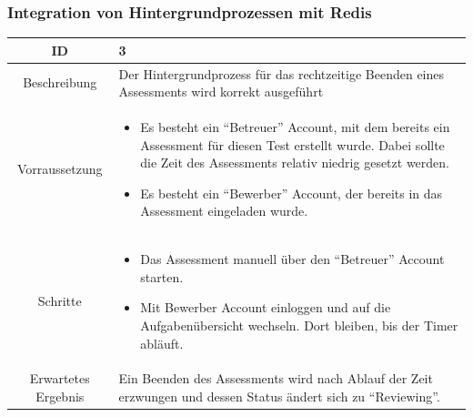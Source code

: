 \subsubsection{Integration von Hintergrundprozessen mit Redis}
\begin{tabularx}{\textwidth}[H]{|c|X|}
    \hline
    ID & 3 \\ 
    \hline

    Beschreibung &
    Der Hintergrundprozess für das rechtzeitige Beenden eines Assessments wird korrekt ausgeführt
    \\ \hline

    Vorraussetzung &
    \begin{itemize}
        \item Es besteht ein \enquote{Betreuer} Account, mit dem bereits ein Assessment für diesen Test erstellt wurde.
              Dabei sollte die Zeit des Assessments relativ niedrig gesetzt werden.
        \item Es besteht ein \enquote{Bewerber} Account, der bereits in das Assessment eingeladen wurde.
    \end{itemize}
    \\ \hline

    Schritte &
    \begin{itemize}
        \item Das Assessment manuell über den \enquote{Betreuer} Account starten.
        \item Mit Bewerber Account einloggen und auf die Aufgabenübersicht wechseln. Dort bleiben, bis der Timer abläuft.
    \end{itemize}
    \\ \hline

    Erwartetes Ergebnis &
    Ein Beenden des Assessments wird nach Ablauf der Zeit erzwungen und dessen Status ändert sich zu \enquote{Reviewing}.
    \\ \hline
\end{tabularx}
